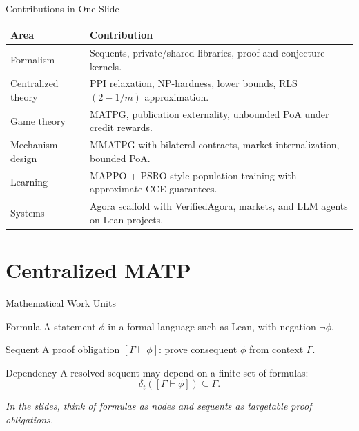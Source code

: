 \documentclass[10pt,aspectratio=169]{beamer}
\newcommand{\proves}{\vdash}
\begin{document}
\begin{frame}{Contributions in One Slide}
\small
\begin{tabular}{p{}p{}}
\toprule
\textbf{Area} & \textbf{Contribution} \\
\midrule
Formalism & Sequents, private/shared libraries, proof and conjecture kernels. \\
Centralized theory & PPI relaxation, NP-hardness, lower bounds, RLS $(2-1/m)$ approximation. \\
Game theory & MATPG, publication externality, unbounded PoA under credit rewards. \\
Mechanism design & MMATPG with bilateral contracts, market internalization, bounded PoA. \\
Learning & MAPPO + PSRO style population training with approximate CCE guarantees. \\
Systems & Agora scaffold with VerifiedAgora, markets, and LLM agents on Lean projects. \\
\bottomrule
\end{tabular}
\end{frame}

\section{Centralized MATP}

\begin{frame}{Mathematical Work Units}
\small
\begin{block}{Formula}
A statement $\phi$ in a formal language such as Lean, with negation $\neg\phi$.
\end{block}
\begin{block}{Sequent}
A proof obligation $[\Gamma \proves \phi]$: prove consequent $\phi$ from context $\Gamma$.
\end{block}
\begin{block}{Dependency}
A resolved sequent may depend on a finite set of formulas:
\[
\delta_t([\Gamma \proves \phi]) \subseteq \Gamma.
\]
\end{block}

\vspace{0.2em}
\centering
\textit{In the slides, think of formulas as nodes and sequents as targetable proof obligations.}
\end{frame}
\end{document}
